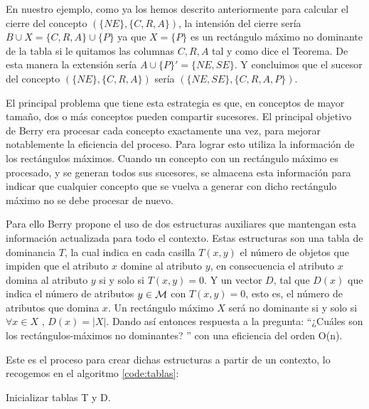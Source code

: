 \documentclass[oneside,openright,titlepage,numbers=noenddot,openany,headinclude,footinclude=true,
cleardoublepage=empty,abstractoff,BCOR=5mm,paper=a4,fontsize=12pt,main=spanish]{scrreprt}
\begin{document}
En nuestro ejemplo, como ya los hemos descrito anteriormente para calcular el cierre del concepto $(\{NE\},\{C,R,A\})$, la intensión del cierre sería $B\cup X=\{C,R,A\}\cup \{P\}$ ya que $X=\{P\}$ es un rectángulo máximo no dominante de la tabla si le quitamos las columnas $C,R,A$ tal y como dice el Teorema. De esta manera la extensión sería $A\cup \{P\}'=\{NE,SE\}$. Y concluimos que el sucesor del concepto  $(\{NE\},\{C,R,A\})$ sería $(\{NE,SE\},\{C,R,A,P\})$.

El principal problema que tiene esta estrategia es que, en conceptos de mayor tamaño, dos o más conceptos pueden compartir sucesores. El principal objetivo de Berry era procesar cada concepto exactamente una vez, para mejorar notablemente la eficiencia del proceso. Para lograr esto utiliza la información de los rectángulos máximos. Cuando un concepto con un rectángulo máximo es procesado, y se generan todos sus sucesores, se almacena esta información para indicar que cualquier concepto que se vuelva a generar con dicho rectángulo máximo no se debe procesar de nuevo. 


Para ello Berry propone el uso de dos estructuras auxiliares que mantengan esta información actualizada para todo el contexto. Estas estructuras son una tabla de dominancia $T$, la cual indica en cada casilla $T(x,y)$ el número de objetos que impiden que el atributo $x$ domine al atributo $y$, en consecuencia el atributo $x$ domina al atributo $y$ si y solo si $T(x,y)=0$. Y un vector $D$, tal que $D(x)$ que indica el número de atributos $y\in \mathcal{M}$ con $T(x,y)=0$, esto es, el número de atributos que domina $x$. Un rectángulo máximo $X$ será no dominante si y solo si $\forall x \in X$ , $D(x)=|X|$. Dando así entonces respuesta a la pregunta: ``¿Cuáles son los rectángulos-máximos no dominantes?
'' con una eficiencia del orden O(n).

Este es el proceso para crear dichas estructuras a partir de un contexto, lo recogemos en el algoritmo \ref{code:tablas}:

\begin{algorithm}[H]
\caption{Inicializar tablas T y D.}
\label{code:tablas}
     

\end{algorithm}
\end{document}
